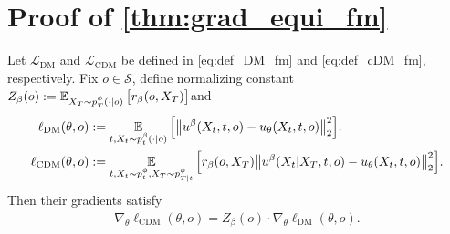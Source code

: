 \section{\texorpdfstring{Proof of \cref{thm:grad_equi_fm}}{Proof of Theorem \ref{thm:grad_equi_fm}}}
\label{sec:proof_grad_equi_fm}
\begin{theorem}
Let $\mathcal{L}_{\mathrm{DM}}$ and $\mathcal{L}_{\mathrm{CDM}}$ be defined in \eqref{eq:def_DM_fm} and \eqref{eq:def_cDM_fm}, respectively.
Fix $o \in\mathcal S$, define normalizing constant
$Z_{\beta}(o) := \operatorname*{{\mathbb{E}}}_{X_T \sim p_T^\phi(\cdot|o)}\big[r_\beta(o,X_T)\big]$and 
\begin{align*}
    \ell_{\mathrm{DM}}(\theta,o)
    &:=
    \operatorname*{{\mathbb{E}}}_{t, X_t \sim p_t^\beta(\cdot|o)}
    \Big[
        \big\|
            u^\beta(X_t,t,o)
            - u_\theta(X_t,t,o)
        \big\|_2^2
    \Big].
    \\
    \ell_{\mathrm{CDM}}(\theta,o)
    &:=
    \operatorname*{{\mathbb{E}}}_{t, X_t \sim p_t^\phi, X_T \sim p_{T| t}^\phi}
    \Big[
        r_\beta(o,X_T)
        \big\|
            u^\beta(X_t| X_T,t,o)
            - u_\theta(X_t,t,o)
        \big\|_2^2
    \Big].
\end{align*}
Then their gradients satisfy
\begin{align*}
    \nabla_\theta \ell_{\mathrm{CDM}}(\theta,o)
    =
    Z_{\beta}(o) \cdot \nabla_\theta \ell_{\mathrm{DM}}(\theta,o).
\end{align*}
\end{theorem}
